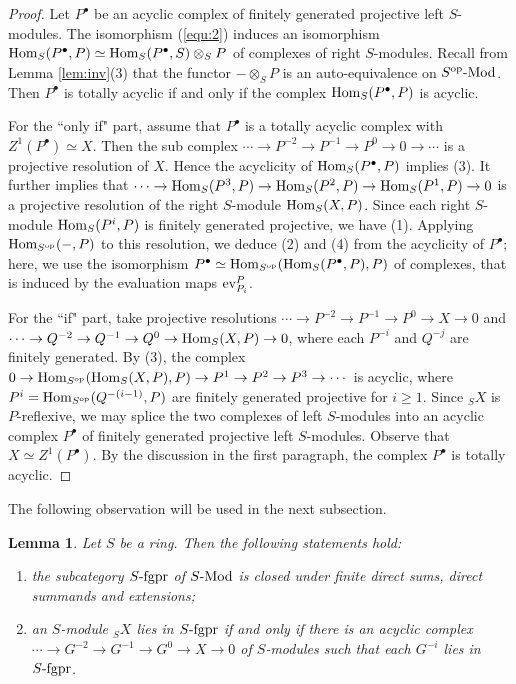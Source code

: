 \documentclass[a4paper]{amsart}
\newtheorem{lem}[thm]{Lemma}
\theoremstyle{definition}
\theoremstyle{remark}
\numberwithin{equation}{section}
\begin{document}
\begin{proof}
Let $P^\bullet$ be an acyclic complex of finitely generated projective left $S$-modules. The isomorphism (\ref{equ:2}) induces an
isomorphism ${\rm Hom}_S(P^\bullet, P)\simeq {\rm Hom}_S(P^\bullet, S)\otimes_S P$ of complexes of right $S$-modules. Recall from Lemma \ref{lem:inv}(3) that the functor $-\otimes_S P$ is an auto-equivalence on $S^{\rm op}\mbox{-Mod}$. Then $P^\bullet$ is totally acyclic if and only if the complex ${\rm Hom}_S(P^\bullet, P)$ is acyclic.

For the ``only if" part, assume that $P^\bullet$ is a totally acyclic complex with $Z^1(P^\bullet)\simeq X$. Then the sub complex
$\cdots \rightarrow P^{-2} \rightarrow P^{-1}\rightarrow P^0\rightarrow 0 \rightarrow \cdots$ is a projective resolution of $X$. Hence the acyclicity of ${\rm Hom}_S(P^\bullet, P)$ implies  (3). It further implies that $\cdots \rightarrow {\rm Hom}_S(P^3, P) \rightarrow {\rm Hom}_S(P^2, P)\rightarrow {\rm Hom}_S(P^1, P)\rightarrow 0$ is a projective resolution of the right $S$-module ${\rm Hom}_S(X, P)$. Since each right $S$-module ${\rm Hom}_S(P^i, P)$ is finitely generated projective, we have (1). Applying ${\rm Hom}_{S^{\rm op}}(-, P)$ to this resolution, we deduce (2) and (4) from the acyclicity of $P^\bullet$; here, we use the isomorphism  $P^\bullet \simeq {\rm Hom}_{S^{\rm op}}({\rm Hom}_S(P^\bullet, P), P)$ of complexes, that is  induced by the evaluation maps ${\rm ev}_{P_i}^P$.

For the ``if" part, take projective resolutions $\cdots \rightarrow P^{-2}\rightarrow P^{-1}\rightarrow P^0\rightarrow X\rightarrow 0$ and $\cdots \rightarrow Q^{-2} \rightarrow Q^{-1}\rightarrow Q^{0}\rightarrow {\rm Hom}_{S}(X, P)\rightarrow 0$, where each $P^{-i}$ and $Q^{-j}$ are finitely generated. By (3), the complex $0\rightarrow {\rm Hom}_{S^{\rm op}}({\rm Hom}_S(X, P), P)\rightarrow P^1\rightarrow P^2\rightarrow P^3\rightarrow \cdots $ is acyclic, where $P^i={\rm Hom}_{S^{\rm op}}(Q^{-(i-1)}, P)$ are finitely generated projective for $i\geq 1$. Since $_SX$ is $P$-reflexive, we may splice the two complexes of left $S$-modules into an acyclic complex $P^\bullet$ of finitely generated projective left $S$-modules. Observe that $X\simeq Z^1(P^\bullet)$. By the discussion in the first paragraph, the complex $P^\bullet$ is totally acyclic.
\end{proof}

The following observation will be used in the next subsection.

\begin{lem}\label{lem:fgpr}
Let $S$ be a ring. Then the following statements hold:
\begin{enumerate}
\item the subcategory $S\mbox{-{\rm fgpr}}$ of $S\mbox{-{\rm Mod}}$ is closed under finite direct sums, direct summands and extensions;
\item an $S$-module $_SX$ lies in $S\mbox{-{\rm fgpr}}$ if and only if there is an acyclic complex $\cdots \rightarrow G^{-2}\rightarrow G^{-1}\rightarrow G^0\rightarrow X \rightarrow 0$ of $S$-modules such that each $G^{-i}$ lies in $S\mbox{-{\rm fgpr}}$.
\end{enumerate}
\end{lem}
\end{document}
